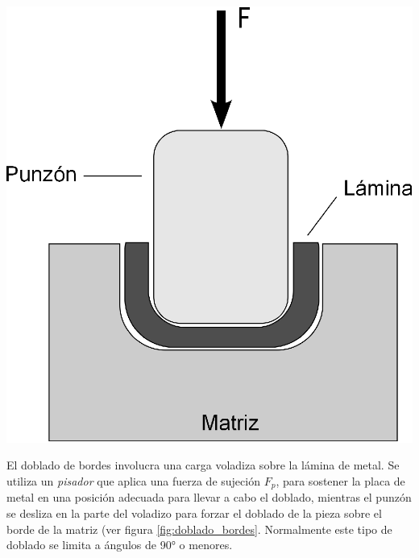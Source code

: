 \begin{center}
\includegraphics[scale=0.4]{src/ch2/doblado_u.eps}
\label{fig:doblado_u}
\end{center}

El doblado de bordes involucra una carga voladiza sobre la lámina de metal. Se utiliza 
un \textit{pisador} que aplica una fuerza de sujeción $F_p$, para sostener la placa de 
metal en una posición adecuada para llevar a cabo el doblado, mientras el punzón 
se desliza en la parte del voladizo para forzar el doblado de la pieza sobre el borde 
de la matriz (ver figura \ref{fig:doblado_bordes}. Normalmente este tipo de doblado 
se limita a ángulos de 90° o menores.

